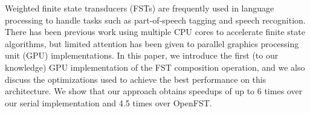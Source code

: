 Weighted finite state transducers (FSTs) are frequently used in language processing to handle tasks such as part-of-speech tagging and speech recognition. There has been previous work using multiple CPU cores to accelerate finite state algorithms, but limited attention has been given to parallel graphics processing unit (GPU) implementations. In this paper, we introduce the first (to our knowledge) GPU implementation of the FST composition operation, and we also discuss the optimizations used to achieve the best performance on this architecture. We show that our approach obtains speedups of up to 6 times over our serial implementation and 4.5 times over OpenFST.
